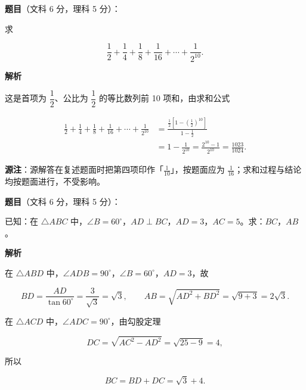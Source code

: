 \begin{answer}

\textbf{题目}（文科 6 分，理科 5 分）：

求

\nopagebreak[4]
\[
\frac12+\frac14+\frac18+\frac1{16}+\cdots+\frac{1}{2^{10}}.
\]

\textbf{解析}

这是首项为 $\dfrac12$、公比为 $\dfrac12$ 的等比数列前 10 项和，由求和公式

\nopagebreak[4]
\[
\begin{aligned}
\frac12+\frac14+\frac18+\frac1{16}+\cdots+\frac1{2^{10}}
&=\frac{\frac12\left[1-\left(\frac12\right)^{10}\right]}{1-\frac12}\\
&=1-\frac1{2^{10}}
=\frac{2^{10}-1}{2^{10}}
=\frac{1023}{1024}.
\end{aligned}
\]

\begin{gktip}
\textbf{源注}：源解答在复述题面时把第四项印作「$\frac1{10}$」，按题面应为 $\frac1{16}$；求和过程与结论均按题面进行，不受影响。
\end{gktip}


\end{answer}
\begin{answer}

\textbf{题目}（文科 6 分，理科 5 分）：

已知：在 $\triangle ABC$ 中，$\angle B=60^\circ$，$AD\perp BC$，$AD=3$，$AC=5$。求：$BC$，$AB$。
\nopagebreak[4]
\begin{center}\end{center}
\nopagebreak[4]
\textbf{解析}
\nopagebreak[4]
\begin{center}\end{center}
\nopagebreak[4]
在 $\triangle ABD$ 中，$\angle ADB=90^\circ$，$\angle B=60^\circ$，$AD=3$，故

\nopagebreak[4]
\[
BD=\frac{AD}{\tan60^\circ}=\frac{3}{\sqrt3}=\sqrt3,
\qquad
AB=\sqrt{AD^2+BD^2}=\sqrt{9+3}=2\sqrt3.
\]

在 $\triangle ACD$ 中，$\angle ADC=90^\circ$，由勾股定理

\nopagebreak[4]
\[
DC=\sqrt{AC^2-AD^2}=\sqrt{25-9}=4,
\]

所以

\nopagebreak[4]
\[
BC=BD+DC=\sqrt3+4.
\]


\end{answer}
